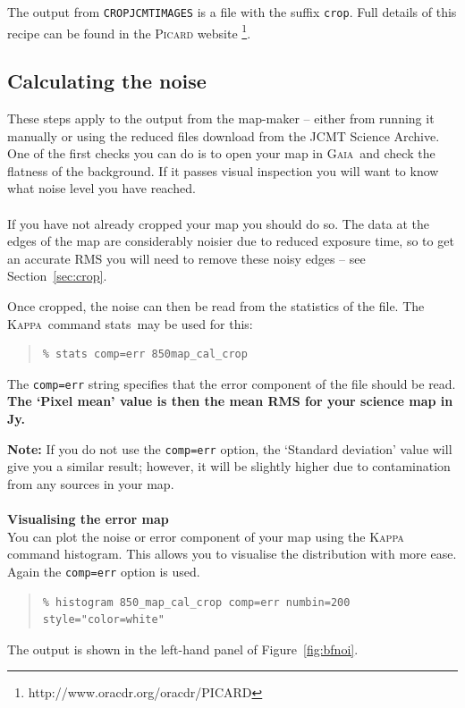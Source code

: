 \documentclass[twoside,11pt]{article}
\newcommand{\htmladdnormallink}[2]{#1}
\newcommand{\htmlref}[2]{#1}
\newcommand{\latex}[1]{#1}
\newcommand{\latexhtml}[2]{#1}
\newcommand{\xref}[3]{#1}
\newcommand{\xlabel}[1]{}
\renewcommand{\_}{\texttt{\symbol{95}}}
\newenvironment{myquote}{\begin{quote}\begin{small}}{\end{small}\end{quote}}
\newcommand{\gaia}{\xref{\textsc{Gaia}}{sun214}{}}
\newcommand{\Kappa}{\xref{\textsc{Kappa}}{sun95}{}}
\newcommand{\task}[1]{\textsf{#1}}
\newcommand{\param}[1]{\texttt{#1}}
\newcommand{\histogram}{\xref{\task{histogram}}{sun95}{HISTOGRAM}}
\newcommand{\stats}{\xref{\task{stats}}{sun95}{STATS}}
\newcommand{\cref}[3]{\latexhtml{#1~\ref{#2}}{\htmlref{#3}{#2}}}
\begin{document}
The output from \param{CROP\_JCMT\_IMAGES} is a file with the suffix
\texttt{\_crop}. Full details of this recipe can be found in the
\htmladdnormallink{\textsc{Picard} website}{http://www.oracdr.org/oracdr/PICARD}
\latex{\footnote{http://www.oracdr.org/oracdr/PICARD}}.

\subsection{\xlabel{noise}Calculating the noise}

These steps apply to the output from the map-maker -- either from
running it manually or using the reduced files download from the JCMT
Science Archive. One of the first checks you can do is to open your
map in \gaia\ and check the flatness of the background. If it passes
visual inspection you will want to know what noise level you have
reached.
\\ \\
If you have not already cropped your map you should do so. The data at
the edges of the map are considerably noisier due to reduced exposure
time, so to get an accurate RMS you will need to remove these noisy
edges -- see \cref{Section}{sec:crop}{Cropping your map}.

Once cropped, the noise can then be read from the statistics of the
file. The \Kappa\ command \stats\ may be used for this:
\begin{myquote}
\begin{verbatim}
% stats comp=err 850map_cal_crop
\end{verbatim}
\end{myquote}
The \param{comp=err} string specifies that the error component of the
file should be read. \textbf{The `Pixel mean' value is then the mean
RMS for your science map in Jy.}

\textbf{Note:} If you do not use the \param{comp=err} option, the `Standard
deviation' value will give you a similar result; however, it will be
slightly higher due to contamination from any sources in your map.
\\ \\
\textbf{Visualising the error map}\\
You can plot the noise or error component of your map using the
\textsc{Kappa} command \histogram. This allows you to visualise the
distribution with more ease. Again the \param{comp=err} option is
used.
\begin{myquote}
\begin{verbatim}
% histogram 850_map_cal_crop comp=err numbin=200  style="color=white"
\end{verbatim}
\end{myquote}
The output is shown in the left-hand panel of \cref{Figure}{fig:bfnoi}{the
graphics below}.
\end{document}
